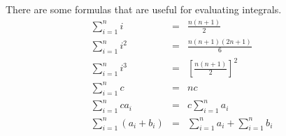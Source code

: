\begin{frame}
There are some formulas that are useful for evaluating integrals.
\begin{eqnarray*}
\sum_{i=1}^n i & = & \frac{n(n+1)}{2}\\
\sum_{i=1}^n i^2 & = & \frac{n(n+1)(2n+1)}{6}\\
\sum_{i=1}^n i^3 & = & \left[\frac{n(n+1)}{2}\right]^2\\
\sum_{i=1}^n c & = & nc\\
\sum_{i=1}^n ca_i & = & c\sum_{i=1}^n a_i\\
\sum_{i=1}^n (a_i+b_i) & = & \sum_{i=1}^n a_i + \sum_{i=1}^n b_i
\end{eqnarray*}
\end{frame}
